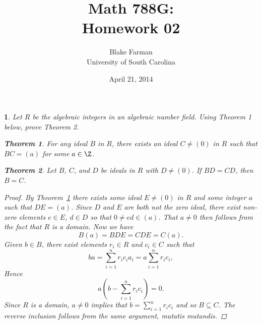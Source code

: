 \documentclass[10pt]{amsart}
\author{Blake Farman\\University of South Carolina}
\title{Math 788G:\\Homework 02}
\date{April 21, 2014}
\begin{document}
\maketitle

\providecommand{\Tr}[2]{\operatorname{Tr}_{#1}\left(#2\right)}
\providecommand{\p}{\mathfrak{p}}
\providecommand{\m}{\mathfrak{m}}
\providecommand{\Deck}[1]{\operatorname{Deck}\left(#1\right)}
\newtheorem{thm}{}
\newtheorem{lem}{Lemma}
\newtheorem{prop}{Proposition}
\theoremstyle{definition}
\newtheorem{defn}{Definition}[thm]

\newcommand{\A}{\mathbb{A}}

\begin{thm}\label{Ex1}
	Let $R$ be the algebraic integers in an algebraic number field.
	Using Theorem 1 below, prove Theorem 2.
	
	\newtheorem{tthm}{Theorem}
	\begin{tthm}\label{T.1.1}
		For any ideal $B$ in $R$, there exists an ideal $C \neq (0)$ in $R$ such that $BC = (a)$ for some $a \in \Z$.
	\end{tthm}

	\begin{tthm}
		Let $B$, $C$, and $D$ be ideals in $R$ with $D \neq (0)$.
		If $BD = CD$, then $B = C$.
	\end{tthm}

	\begin{proof}
		By Theorem~\ref{T.1.1} there exists some ideal $E \neq (0)$ in $R$ and some integer $a$ such that $DE = (a)$.
		Since $D$ and $E$ are both not the zero ideal, there exist non-zero elements $e \in E$, $d \in D$ so that $0 \neq ed \in (a)$.
		That $a \neq 0$ then follows from the fact that $R$ is a domain.
		Now we have
		$$B(a) = BDE = CDE = C(a).$$
		Given $b \in B$, there exist elements $r_i \in R$ and $c_i \in C$ such that
		$$ba = \sum_{i=1}^n r_ic_ia_i = a\sum_{i=1}^n r_ic_i,$$
		Hence
		$$a(b - \sum_{i=1}^n r_ic_i) = 0.$$
		Since $R$ is a domain, $a \neq 0$ implies that $b = \sum_{i=1}^n r_ic_i$ and so $B \subseteq C$.
		The reverse inclusion follows from the same argument, mutatis mutandis.
	\end{proof}
\end{thm}
\end{document}
